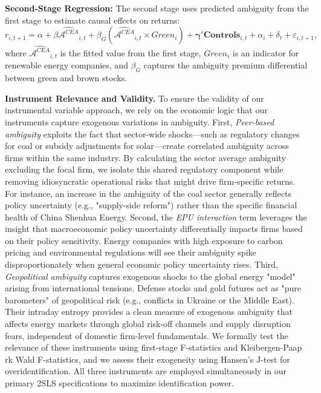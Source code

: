 \documentclass[preprint,12pt,authoryear]{elsarticle}
\begin{document}
\textbf{Second-Stage Regression:} The second stage uses predicted ambiguity from the first stage to estimate causal effects on returns:
\begin{equation}
r_{i,t+1} = \alpha + \beta \widehat{\mathcal{A}^{CEA}}_{i,t} + \beta_G (\widehat{\mathcal{A}^{CEA}}_{i,t} \times Green_i) + \boldsymbol{\gamma}'\mathbf{Controls}_{i,t} + \alpha_i + \delta_t + \varepsilon_{i,t+1},
\end{equation}
where $\widehat{\mathcal{A}^{CEA}}_{i,t}$ is the fitted value from the first stage, $Green_i$ is an indicator for renewable energy companies, and $\beta_G$ captures the ambiguity premium differential between green and brown stocks.

\textbf{Instrument Relevance and Validity.} To ensure the validity of our instrumental variable approach, we rely on the economic logic that our instruments capture exogenous variations in ambiguity. First, \textit{Peer-based ambiguity} exploits the fact that sector-wide shocks—such as regulatory changes for coal or subsidy adjustments for solar—create correlated ambiguity across firms within the same industry. By calculating the sector average ambiguity excluding the focal firm, we isolate this shared regulatory component while removing idiosyncratic operational risks that might drive firm-specific returns. For instance, an increase in the ambiguity of the coal sector generally reflects policy uncertainty (e.g., "supply-side reform") rather than the specific financial health of China Shenhua Energy. Second, the \textit{EPU interaction} term leverages the insight that macroeconomic policy uncertainty differentially impacts firms based on their policy sensitivity. Energy companies with high exposure to carbon pricing and environmental regulations will see their ambiguity spike disproportionately when general economic policy uncertainty rises. Third, \textit{Geopolitical ambiguity} captures exogenous shocks to the global energy "model" arising from international tensions. Defense stocks and gold futures act as "pure barometers" of geopolitical risk (e.g., conflicts in Ukraine or the Middle East). Their intraday entropy provides a clean measure of exogenous ambiguity that affects energy markets through global risk-off channels and supply disruption fears, independent of domestic firm-level fundamentals. We formally test the relevance of these instruments using first-stage F-statistics and Kleibergen-Paap rk Wald F-statistics, and we assess their exogeneity using Hansen's J-test for overidentification. All three instruments are employed simultaneously in our primary 2SLS specifications to maximize identification power.
\end{document}
